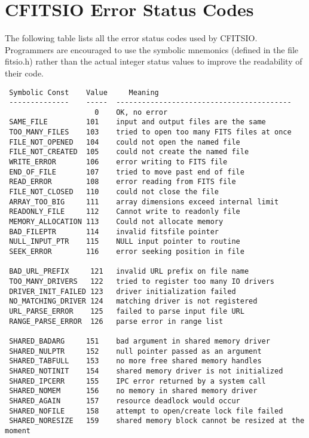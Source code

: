 \documentclass[11pt]{book}
\begin{document}
\chapter{CFITSIO Error Status Codes }

The following table lists all the error status codes used by CFITSIO.
Programmers are encouraged to use the symbolic mnemonics (defined in
the file fitsio.h) rather than the actual integer status values to
improve the readability of their code.

\begin{verbatim}
 Symbolic Const    Value     Meaning
 --------------    -----  -----------------------------------------
                     0    OK, no error
 SAME_FILE         101    input and output files are the same
 TOO_MANY_FILES    103    tried to open too many FITS files at once
 FILE_NOT_OPENED   104    could not open the named file
 FILE_NOT_CREATED  105    could not create the named file
 WRITE_ERROR       106    error writing to FITS file
 END_OF_FILE       107    tried to move past end of file
 READ_ERROR        108    error reading from FITS file
 FILE_NOT_CLOSED   110    could not close the file
 ARRAY_TOO_BIG     111    array dimensions exceed internal limit
 READONLY_FILE     112    Cannot write to readonly file
 MEMORY_ALLOCATION 113    Could not allocate memory
 BAD_FILEPTR       114    invalid fitsfile pointer
 NULL_INPUT_PTR    115    NULL input pointer to routine
 SEEK_ERROR        116    error seeking position in file

 BAD_URL_PREFIX     121   invalid URL prefix on file name
 TOO_MANY_DRIVERS   122   tried to register too many IO drivers
 DRIVER_INIT_FAILED 123   driver initialization failed
 NO_MATCHING_DRIVER 124   matching driver is not registered
 URL_PARSE_ERROR    125   failed to parse input file URL
 RANGE_PARSE_ERROR  126   parse error in range list

 SHARED_BADARG     151    bad argument in shared memory driver
 SHARED_NULPTR     152    null pointer passed as an argument
 SHARED_TABFULL    153    no more free shared memory handles
 SHARED_NOTINIT    154    shared memory driver is not initialized
 SHARED_IPCERR     155    IPC error returned by a system call
 SHARED_NOMEM      156    no memory in shared memory driver
 SHARED_AGAIN      157    resource deadlock would occur
 SHARED_NOFILE     158    attempt to open/create lock file failed
 SHARED_NORESIZE   159    shared memory block cannot be resized at the moment


\end{verbatim}
\end{document}
